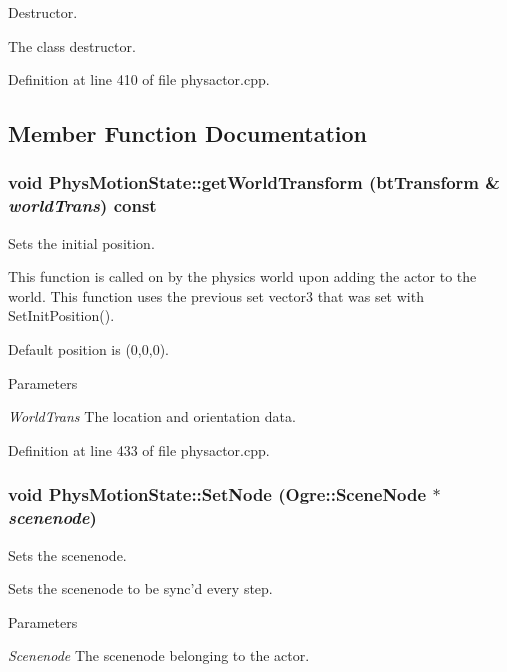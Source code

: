 Destructor. 

The class destructor. 

Definition at line 410 of file physactor.cpp.



\subsection{Member Function Documentation}
\hypertarget{classPhysMotionState_ad7f6fc932da90cc2a718fbe809d95287}{
\subsubsection[{getWorldTransform}]{\setlength{\rightskip}{0pt plus 5cm}void PhysMotionState::getWorldTransform (btTransform \& {\em worldTrans}) const}}
\label{d2/d14/classPhysMotionState_ad7f6fc932da90cc2a718fbe809d95287}


Sets the initial position. 

This function is called on by the physics world upon adding the actor to the world. This function uses the previous set vector3 that was set with SetInitPosition(). \par
 Default position is (0,0,0). 
\begin{DoxyParams}{Parameters}
\item[{\em WorldTrans}]The location and orientation data. \end{DoxyParams}


Definition at line 433 of file physactor.cpp.

\hypertarget{classPhysMotionState_a4ba21f0b58f33197b61cf1a9754027bc}{
\subsubsection[{SetNode}]{\setlength{\rightskip}{0pt plus 5cm}void PhysMotionState::SetNode (Ogre::SceneNode $\ast$ {\em scenenode})}}
\label{d2/d14/classPhysMotionState_a4ba21f0b58f33197b61cf1a9754027bc}


Sets the scenenode. 

Sets the scenenode to be sync'd every step. 
\begin{DoxyParams}{Parameters}
\item[{\em Scenenode}]The scenenode belonging to the actor. \end{DoxyParams}


